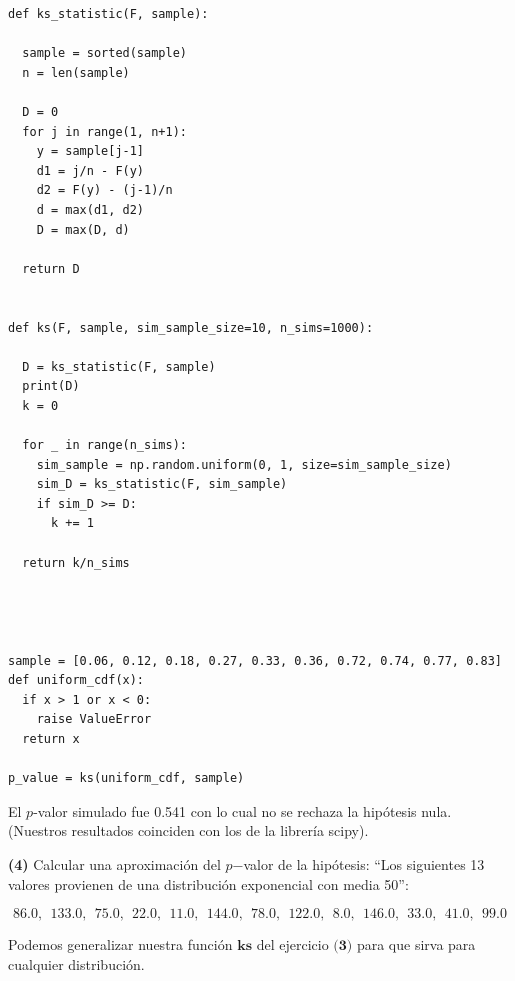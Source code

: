 \documentclass[a4paper, 12pt]{article}
\begin{document}
\begin{verbatim}
def ks_statistic(F, sample):

  sample = sorted(sample)
  n = len(sample)
  
  D = 0 
  for j in range(1, n+1):
    y = sample[j-1]
    d1 = j/n - F(y) 
    d2 = F(y) - (j-1)/n
    d = max(d1, d2)
    D = max(D, d)

  return D


def ks(F, sample, sim_sample_size=10, n_sims=1000):

  D = ks_statistic(F, sample)
  print(D)
  k = 0

  for _ in range(n_sims):
    sim_sample = np.random.uniform(0, 1, size=sim_sample_size)
    sim_D = ks_statistic(F, sim_sample)
    if sim_D >= D:
      k += 1

  return k/n_sims




sample = [0.06, 0.12, 0.18, 0.27, 0.33, 0.36, 0.72, 0.74, 0.77, 0.83]
def uniform_cdf(x):
  if x > 1 or x < 0:
    raise ValueError 
  return x

p_value = ks(uniform_cdf, sample)
\end{verbatim}

El $p$-valor simulado fue 0.541 con lo cual no se rechaza la hipótesis nula.
(Nuestros resultados coinciden con los de la librería scipy).

\pagebreak 

\begin{myframe}
\textbf{(4)} Calcular una aproximación del $p$−valor de la hipótesis: “Los
siguientes 13 valores provienen de una distribución exponencial con media 50”:

$$86.0,~~ 133.0,~~ 75.0,~~ 22.0,~~ 11.0,~~ 144.0,~~ 78.0,~~ 122.0,~~ 8.0,~~ 146.0,~~ 33.0,~~ 41.0,~~ 99.0$$
\end{myframe}

Podemos generalizar nuestra función $\textbf{ks}$ del ejercicio $\textbf{(3)}$
para que sirva para cualquier distribución.
\end{document}
